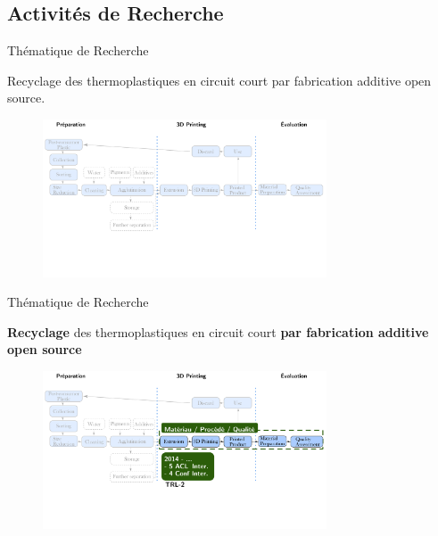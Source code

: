 \documentclass[
  11pt,
  ignorenonframetext,
  aspectratio=169,
  c]{beamer}
\begin{document}
\hypertarget{activituxe9s-de-recherche}{%
\subsection{Activités de Recherche}\label{activituxe9s-de-recherche}}

\begin{frame}[t]{Thématique de Recherche}
\protect\hypertarget{thuxe9matique-de-recherche}{}
\small

Recyclage des thermoplastiques en circuit court par fabrication additive
open source.

\begin{figure}

{\centering \includegraphics[width=0.75\textwidth,height=\textheight]{Figures/slides/DRAM-01.png}

}

\end{figure}

\note{}
\end{frame}

\begin{frame}[t]{Thématique de Recherche}
\protect\hypertarget{thuxe9matique-de-recherche-1}{}
\small

\textbf{Recyclage} des thermoplastiques en circuit court \textbf{par
fabrication additive open source}

\begin{figure}

{\centering \includegraphics[width=0.75\textwidth,height=\textheight]{Figures/slides/DRAM-02.png}

}

\end{figure}
\end{frame}
\end{document}
